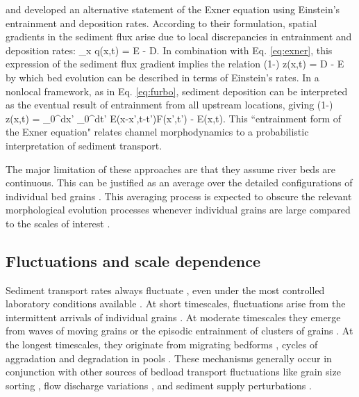 \citet{Nakagawa1976} and \citet{Tsujimoto1978} developed an alternative statement of the Exner equation using Einstein's entrainment and deposition rates.
According to their formulation, spatial gradients in the sediment flux arise due to local discrepancies in entrainment and deposition rates:
\be \partial_x q(x,t) = E - D. \ee 
In combination with Eq. \ref{eq:exner}, this expression of the sediment flux gradient implies the relation
\be (1-\phi) \px z(x,t) = D - E\ee
by which bed evolution can be described in terms of Einstein's rates.
In a nonlocal framework, as in Eq. \ref{eq:furbo}, sediment deposition can be interpreted as the eventual result of entrainment from all upstream locations, giving
\be (1-\phi) \px z(x,t) = \int_0^\infty dx' \int_0^\infty dt' E(x-x',t-t')F(x',t') - E(x,t). \ee
This ``entrainment form of the Exner equation" \citep{Nakagawa1976, Parker2000, Furbish2017} relates channel morphodynamics to a probabilistic interpretation of sediment transport.

The major limitation of these approaches are that they assume river beds are continuous. This can be justified as an average over the detailed configurations of individual bed grains \citep{Coleman2009}. This averaging process is expected to obscure the relevant morphological evolution processes whenever individual grains are large compared to the scales of interest \citep[e.g.][]{Shobe2021}.

\subsection{Fluctuations and scale dependence}

Sediment transport rates always fluctuate \citep{Kuhnle1988,Hoey1992,Recking2012}, even under the most controlled laboratory conditions available \citep{Ancey2006,Roseberry2012}.
At short timescales, fluctuations arise from the intermittent arrivals of individual grains \citep{Bohm2004,Ballio2018}. At moderate timescales they emerge from waves of moving grains \citep{Heyman2014} or the episodic entrainment of clusters of grains \citep{Strom2004,Papanicolaou2018}. At the longest timescales, they originate from migrating bedforms \citep{Guala2014}, cycles of aggradation and degradation in pools \citep{Dhont2018}.
These mechanisms generally occur in conjunction with other sources of bedload transport fluctuations like grain size sorting \citep{Iseya1987,Cudden2003}, flow discharge variations \citep{Wong2006,Mao2012,Redolfi2018}, and sediment supply perturbations \citep{Lisle1993,Madej2009,Elgueta-Astaburuaga2019}.

